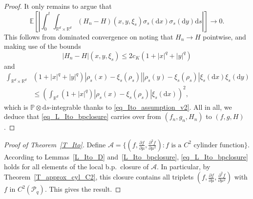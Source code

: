\documentclass{article}
\theoremstyle{definition}
\numberwithin{equation}{section}
\numberwithin{theorem}{section}
\newcommand{\E}{\mathbb{E}}
\renewcommand{\P}{\mathbb{P}}
\newcommand{\R}{\mathbb{R}}
\newcommand{\dx}{\mathrm{d}x}
\newcommand{\dy}{\mathrm{d}y}
\newcommand{\ds}{\mathrm{d}s}
\renewcommand{\P}{{\mathbb P}}
\newcommand{\Acal}{{\mathcal A}}
\newcommand{\Pcal}{{\mathcal P}}
\begin{document}
\begin{proof}
It only remains to argue that
\[
\E\left[ \left|\int_0^t\int_{{\R^d}\times {\R^d}}(H_n-H)(x,y,\xi_s) \sigma_s(\dx)\sigma_s(\dy)\ds\right| \right] \to 0.
\]
This follows from dominated convergence on noting that $H_n \to H$ pointwise, and making use of the bounds
\[
|H_n-H|(x,y,\xi_s) \le 2c_K (1 + |x|^q + |y|^q)
\]
and
\begin{align*}
\int_{{\R^d}\times {\R^d}} & (1 + |x|^q + |y|^q) |\rho_s(x) - \xi_s(\rho_s)|  |\rho_s(y) - \xi_s(\rho_s)| \xi_s(\dx) \xi_s(\dy) \\
&\le \left( \int_{\R^d} (1 + |x|^q) |\rho_s(x) - \xi_s(\rho_s)| \xi_s(\dx) \right)^2,
\end{align*}
which is $\P \otimes \ds$-integrable thanks to \eqref{eq_Ito_assumption_v2}. All in all, we deduce that \eqref{eq_L_Ito_bpclosure} carries over from $(f_n,g_n,H_n)$ to $(f,g,H)$.
\end{proof}




\begin{proof}[Proof of Theorem~\ref{T_Ito}]
Define $\Acal=\{(f,\frac{\partial f}{\partial\mu},\frac{\partial^2f}{\partial\mu^2})\colon \text{$f$ is a $C^2$ cylinder function}\}$. According to Lemmas~\ref{L_Ito_D} and~\ref{L_Ito_bpclosure}, \eqref{eq_L_Ito_bpclosure} holds for all elements of the local b.p.~closure of $\Acal$. In particular, by Theorem~\ref{T_approx_cyl_C2}, this closure contains all triplets $(f,\frac{\partial f}{\partial\mu},\frac{\partial^2f}{\partial\mu^2})$ with $f$ in $C^2(\Pcal_q)$. This gives the result.
\end{proof}
\end{document}
